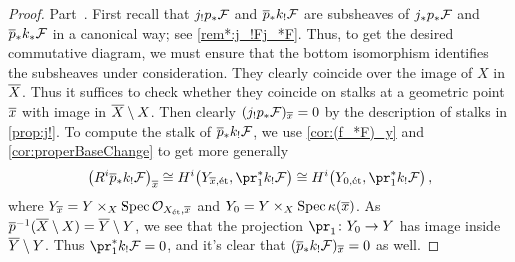 \documentclass[a4paper, 10pt, oneside, DIV=9, chapterprefix=true, numbers=enddot, bibliography=totoc]{scrbook}
\begin{document}
\begin{proof}
	Part~. First recall that $j_!p_*\mathcal{F}$ and $\ov{p}_*k_!\Ff$ are subsheaves of $j_*p_*\mathcal{F}$ and $\ov{p}_*k_*\Ff$ in a canonical way; see \cref{rem*:j_!Fj_*F}. Thus, to get the desired commutative diagram, we must ensure that the bottom isomorphism identifies the subsheaves under consideration. They clearly coincide over the image of $X$ in $\ov{X}$. Thus it suffices to check whether they coincide on stalks at a geometric point $\ov{x}$ with image in $\ov{X}\setminus X$. Then clearly $(j_!p_*\Ff)_{\ov{x}}=0$ by the description of stalks in \cref{prop:j!}. To compute the stalk of $\ov{p}_*k_!\Ff$, we use \cref{cor:(f_*F)_y} and \cref{cor:properBaseChange} to get more generally
	\begin{equation*}
		\big(R^i\ov{p}_*k_!\Ff\big)_{\ov{x}}\cong H^i\big(Y_{\ov{x},\et},\pr_1^*k_!\Ff\big)\cong H^i\big(Y_{0,\et},\pr_1^*k_!\Ff\big)\,,
	\end{equation*}
	where $Y_{\ov{x}}=Y\times_X\Spec \Oo_{X_\et,\ov{x}}$ and $Y_0=Y\times_X\Spec \kappa(\ov{x})$. As $\ov{p}^{-1}(\ov{X}\setminus X)=\ov{Y}\setminus Y$, we see that the projection $\pr_1\colon Y_0\morphism Y$ has image inside $\ov{Y}\setminus Y$. Thus $\pr_1^*k_!\Ff=0$, and it's clear that $(\ov{p}_*k_!\Ff)_{\ov{x}}=0$ as well.
	

\end{proof}
\end{document}
